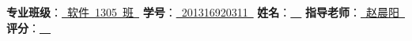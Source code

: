 \newcommand{\ctli}[2]{{\bf #1}：\underline{{~#2~}}\hfill}

\begin{center}

{\bfseries{}}

\vspace*{1em}

{\small
\ctli{专业班级}{软件~1305~班}
\ctli{学号}{201316920311}
\ctli{姓名}{\tjf}
\ctli{指导老师}{赵晨阳}
\ctli{评分}{\qquad\qquad}
}

\end{center}
